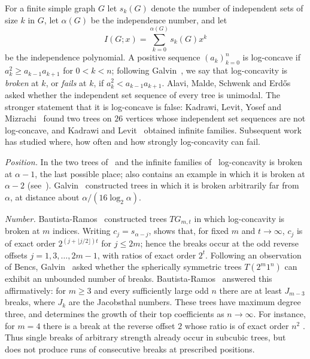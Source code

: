 \documentclass[11pt]{amsart}
\theoremstyle{definition}
\theoremstyle{remark}
\numberwithin{equation}{section}
\begin{document}
For a finite simple graph $G$ let $s_k(G)$ denote the number of independent sets of size $k$ in $G$, let $\alpha(G)$ be the independence number, and let
\[
I(G;x)=\sum_{k=0}^{\alpha(G)}s_k(G)x^k
\]
be the independence polynomial. A positive sequence $(a_k)_{k=0}^{n}$ is log-concave if $a_k^2\ge a_{k-1}a_{k+1}$ for $0<k<n$; following Galvin~\cite{Gal}, we say that log-concavity is \emph{broken} at $k$, or \emph{fails} at $k$, if $a_k^2<a_{k-1}a_{k+1}$. Alavi, Malde, Schwenk and Erd\H{o}s~\cite{AMSE} asked whether the independent set sequence of every tree is unimodal. The stronger statement that it is log-concave is false: Kadrawi, Levit, Yosef and Mizrachi~\cite{KLYM} found two trees on $26$ vertices whose independent set sequences are not log-concave, and Kadrawi and Levit~\cite{KL} obtained infinite families. Subsequent work has studied where, how often and how strongly log-concavity can fail.

\smallskip
\noindent\emph{Position.} In the two trees of~\cite{KLYM} and the infinite families of~\cite{KL} log-concavity is broken at $\alpha-1$, the last possible place; \cite{KL} also contains an example in which it is broken at $\alpha-2$ (see~\cite[Section~1]{Gal}). Galvin~\cite[Theorems~1.3 and~2.1]{Gal} constructed trees in which it is broken arbitrarily far from $\alpha$, at distance about $\alpha/(16\log_2\alpha)$.

\smallskip
\noindent\emph{Number.} Bautista-Ramos~\cite[Theorem~1]{BR1} constructed trees $TG_{m,t}$ in which log-concavity is broken at $m$ indices. Writing $c_j=s_{\alpha-j}$, \cite[Lemma~3]{BR1} shows that, for fixed $m$ and $t\to\infty$, $c_j$ is of exact order $2^{(j+\lfloor j/2\rfloor)t}$ for $j\le2m$; hence the breaks occur at the odd reverse offsets $j=1,3,\dots,2m-1$, with ratios of exact order $2^t$. Following an observation of Bencs, Galvin~\cite[Question~3.2]{Gal} asked whether the spherically symmetric trees $T(2^m1^n)$ can exhibit an unbounded number of breaks. Bautista-Ramos~\cite[Corollary~3]{BR2} answered this affirmatively: for $m\ge3$ and every sufficiently large odd $n$ there are at least $J_{m-3}$ breaks, where $J_k$ are the Jacobsthal numbers. These trees have maximum degree three, and \cite[Theorem~3]{BR2} determines the growth of their top coefficients as $n\to\infty$. For instance, for $m=4$ there is a break at the reverse offset $2$ whose ratio is of exact order $n^2$ \cite[Lemma~18 and its proof]{BR2}. Thus single breaks of arbitrary strength already occur in subcubic trees, but~\cite{BR2} does not produce runs of consecutive breaks at prescribed positions.
\end{document}
